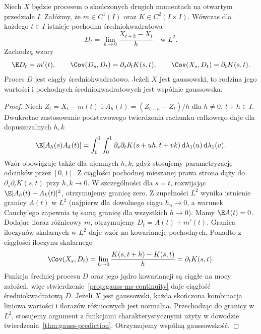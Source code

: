 \begin{twierdzenie}
\label{thm:gauss-ms-derivative}
Niech $X$ będzie procesem o skończonych drugich
momentach na otwartym przedziale $I$. Załóżmy, że
$m\in C^1(I)$ oraz $K\in C^2(I\times I)$.
Wówczas dla każdego $t\in I$ istnieje pochodna
średniokwadratowa
\[
D_t=\lim_{h\to0}\frac{X_{t+h}-X_t}{h}
\quad\text{w }L^2.
\]
Zachodzą wzory
\[
\E D_t=m'(t),\qquad
\Cov(D_s,D_t)=\partial_s\partial_t K(s,t),
\qquad
\Cov(X_s,D_t)=\partial_t K(s,t).
\]
Proces $D$ jest ciągły średniokwadratowo.
Jeżeli $X$ jest gaussowski, to rodzina jego wartości
i pochodnych średniokwadratowych jest wspólnie
gaussowska.
\end{twierdzenie}
\begin{proof}
Niech $Z_t=X_t-m(t)$ i
$A_h(t)=(Z_{t+h}-Z_t)/h$ dla $h\ne0$, $t+h\in I$.
Dwukrotne zastosowanie podstawowego twierdzenia
rachunku całkowego daje dla dopuszczalnych $h,k$
\[
\E[A_h(s)A_k(t)]
=\int_0^1\int_0^1
\partial_s\partial_t K(s+uh,t+vk)
\,\mathrm d\lambda_1(u)\,\mathrm d\lambda_1(v).
\]
Wzór obowiązuje także dla ujemnych $h,k$, gdyż
stosujemy parametryzację odcinków przez $[0,1]$.
Z ciągłości pochodnej mieszanej prawa strona dąży
do $\partial_s\partial_t K(s,t)$ przy $h,k\to0$.
W szczególności dla $s=t$, rozwijając
$\E|A_h(t)-A_k(t)|^2$, otrzymujemy granicę zero.
Z zupełności $L^2$ wynika istnienie granicy $A(t)$
w $L^2$ (najpierw dla dowolnego ciągu $h_n\to0$,
a warunek Cauchy'ego zapewnia tę samą granicę dla
wszystkich $h\to0$). Mamy $\E A(t)=0$.
Dodając iloraz różnicowy $m$, otrzymujemy
$D_t=A(t)+m'(t)$. Granica iloczynów skalarnych
w $L^2$ daje wzór na kowariancję pochodnych.
Ponadto z ciągłości iloczynu skalarnego
\[
\Cov(X_s,D_t)=\lim_{h\to0}\frac{K(s,t+h)-K(s,t)}{h}
=\partial_t K(s,t).
\]
Funkcja średniej procesu $D$ oraz jego jądro kowariancji
są ciągłe na mocy założeń, więc
stwierdzenie~\ref{prop:gauss-ms-continuity}
daje ciągłość średniokwadratową $D$.
Jeżeli $X$ jest gaussowski, każda skończona kombinacja
liniowa wartości i ilorazów różnicowych jest normalna.
Przechodząc do granicy w $L^2$, stosujemy argument
z funkcjami charakterystycznymi użyty w dowodzie
twierdzenia~\ref{thm:gauss-prediction}. Otrzymujemy wspólną gaussowskość.
\end{proof}

